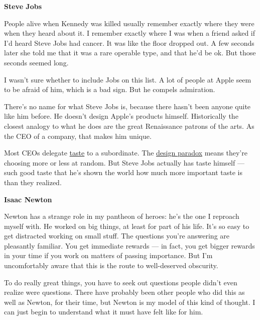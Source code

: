                   \textbf{Steve Jobs}

People alive when Kennedy was
                  killed usually remember exactly where they were when they
                  heard about it. I remember exactly where I was when a friend
                  asked if I'd heard Steve Jobs had cancer. It was like the
                  floor dropped out. A few seconds later she told me that it was
                  a rare operable type, and that he'd be ok. But those seconds
                  seemed long.

I wasn't sure whether to include Jobs
                  on this list. A lot of people at Apple seem to be afraid of
                  him, which is a bad sign. But he compels admiration.

There's
                  no name for what Steve Jobs is, because there hasn't been
                  anyone quite like him before. He doesn't design Apple's
                  products himself. Historically the closest analogy to what he
                  does are the great Renaissance patrons of the arts. As the CEO
                  of a company, that makes him unique.

Most CEOs
                  delegate \href{http://www.paulgraham.com/taste.html}{taste} to a subordinate. The
                  \href{http://www.paulgraham.com/gh.html}{design paradox}
                  means they're choosing more or less at random. But Steve Jobs
                  actually has taste himself --- such good taste that he's
                  shown the world how much more important taste is than they
                  realized.


                  \textbf{Isaac Newton}

Newton has a strange role in my
                  pantheon of heroes: he's the one I reproach myself with. He
                  worked on big things, at least for part of his life. It's so
                  easy to get distracted working on small stuff. The questions
                  you're answering are pleasantly familiar. You get immediate
                  rewards --- in fact, you get bigger rewards in your time
                  if you work on matters of passing importance. But I'm
                  uncomfortably aware that this is the route to well-deserved
                  obscurity.

To do really great things, you have to
                  seek out questions people didn't even realize were questions.
                  There have probably been other people who did this as well as
                  Newton, for their time, but Newton is my model of this kind of
                  thought. I can just begin to understand what it must have felt
                  like for him.

